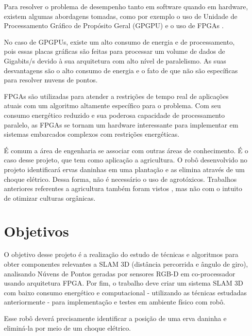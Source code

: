 	Para resolver o problema de desempenho tanto em software quando em hardware, existem algumas abordagens tomadas, como por exemplo o uso de Unidade de Processamento Gráfico de Propósito Geral (GPGPU) \cite{lee2012gpu} e o uso de FPGAs \cite{nikolic2014synchronized}. 
	
	No caso de GPGPUs, existe um alto consumo de energia e de processamento, pois essas placas gráficas são feitas para processar um volume de dados de Gigabits/s devido à sua arquitetura com alto nível de paralelismo. As suas desvantagens são o alto consumo de energia e o fato de que não são específicas para resolver nuvens de pontos.
	
	FPGAs são utilizadas para atender a restrições de tempo real \cite{tertei2014fpga} de aplicações atuais com um algoritmo altamente específico para o problema. Com seu consumo energético reduzido e sua poderosa capacidade de processamento paralelo, as FPGAs se tornam um hardware interessante para implementar em sistemas embarcados complexos com restrições energéticas.
	
	É comum a área de engenharia se associar com outras áreas de conhecimento. É o caso desse projeto, que tem como aplicação a agricultura. O robô desenvolvido no projeto identificará ervas daninhas em uma plantação e as elimina através de um choque elétrico. Dessa forma, não é necessário o uso de agrotóxicos. Trabalhos anteriores referentes a agricultura também foram vistos \cite{cheein2011optimized}, mas não com o intuito de otimizar culturas orgânicas.
	
	\chapter{Objetivos}
	
	O objetivo desse projeto é a realização do estudo de técnicas e algoritmos para obter componentes relevantes a SLAM 3D (distância percorrida e ângulo de giro), analisando Núvens de Pontos geradas por sensores RGB-D em co-processador usando arquitetura FPGA. Por fim, o trabalho deve criar um sistema SLAM 3D com baixo consumo energético e computacional - utilizando as técnicas estudadas anteriormente - para implementação e testes em ambiente físico com robô.
	
	Esse robô deverá precisamente identificar a posição de uma erva daninha e eliminá-la por meio de um choque elétrico. 	

